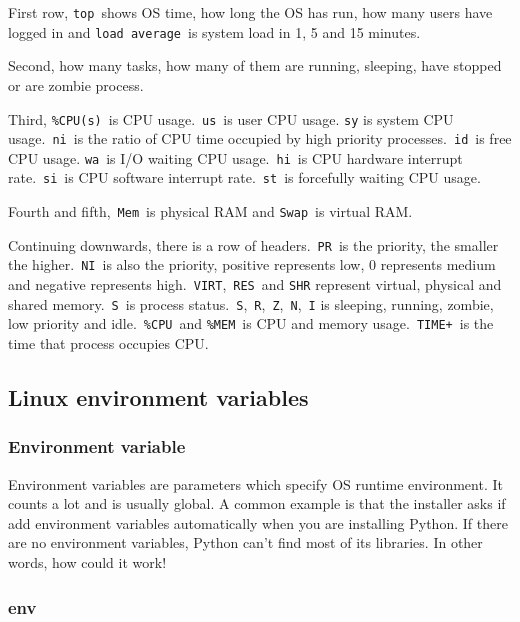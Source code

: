 \documentclass[12pt]{ctexart}
\begin{document}
First row, \texttt{top}\ shows OS time, how long the OS has run, how many
users have logged in and \texttt{load\ average}\ is system load in 1, 5
and 15 minutes.

Second, how many tasks, how many of them are running, sleeping, have
stopped or are zombie process.

Third, \texttt{\%CPU(s)}\ is CPU usage.\ \texttt{us}\ is user CPU usage.
\texttt{sy} is system CPU usage.\ \texttt{ni}\ is the ratio of CPU time
occupied by high priority processes.\ \texttt{id}\ is free CPU usage.
\texttt{wa}\ is I/O waiting CPU usage.\ \texttt{hi}\ is CPU hardware
interrupt rate.\ \texttt{si}\ is CPU software interrupt rate.\ \texttt{st}\
is forcefully waiting CPU usage.

Fourth and fifth,\ \texttt{Mem}\ is physical RAM and \texttt{Swap}\ is
virtual RAM.

Continuing downwards, there is a row of headers.\ \texttt{PR}\ is the
priority, the smaller the higher.\ \texttt{NI}\ is also the priority,
positive represents low, 0 represents medium and negative represents
high.\ \texttt{VIRT},\ \texttt{RES}\ and \texttt{SHR} represent virtual,
physical and shared memory.\ \texttt{S}\ is process status.\ \texttt{S},\
\texttt{R},\ \texttt{Z},\ \texttt{N},\ \texttt{I} is sleeping, running,
zombie, low priority and idle.\ \texttt{\%CPU}\ and \texttt{\%MEM}\ is CPU
and memory usage.\ \texttt{TIME+}\ is the time that process occupies CPU.

\newpage
\subsection{\textbf{Linux environment variables}}

\subsubsection{\textbf{Environment variable}}

Environment variables are parameters which specify OS runtime
environment. It counts a lot and is usually global. A common example is
that the installer asks if add environment variables automatically when
you are installing Python. If there are no environment variables, Python
can't find most of its libraries. In other words, how
could it work!

\subsubsection{\textbf{env}}
\end{document}
